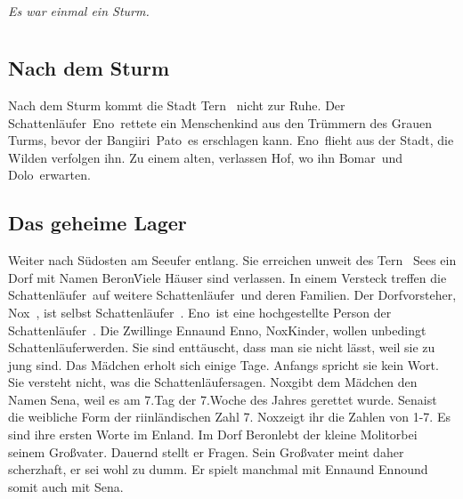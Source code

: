 \documentclass[12pt,a4paper,onecolumn,twoside,ngerman]{book}
\newcommand{\Tern}{Tern }
\newcommand{\Beron}{Beron}
\newcommand{\Molitor}{Molitor}
\newcommand{\Sena}{Sena}
\newcommand{\Bangiri}{Bangiiri}
\newcommand{\Pato}{Pato}
\newcommand{\Enland}{Enland}
\newcommand{\Schattenlaufer}{Schattenläufer}
\newcommand{\Eno}{Eno}
\newcommand{\Bomar}{Bomar}
\newcommand{\Dolo}{Dolo}
\newcommand{\Nox}{Nox}
\newcommand{\Enna}{Enna}
\newcommand{\Enno}{Enno}
\begin{document}
  
  
  
  \tableofcontents
  


\paragraph{}
\textit{Es war einmal ein Sturm.}

\chapter{}
\section{Nach dem Sturm}
Nach dem Sturm kommt die Stadt \Tern\ nicht zur Ruhe.
Der \Schattenlaufer\ \Eno\ rettete ein Menschenkind aus den Trümmern des Grauen Turms, bevor der \Bangiri\ \Pato\ es erschlagen kann. \Eno\ flieht aus der Stadt, die Wilden verfolgen ihn. Zu einem alten, verlassen Hof, wo ihn \Bomar\ und \Dolo\ erwarten. 

\section{Das geheime Lager}
Weiter nach Südosten am Seeufer entlang. Sie erreichen unweit des \Tern\ Sees ein Dorf mit Namen \Beron\. Viele Häuser sind verlassen. In einem Versteck treffen die \Schattenlaufer\ auf weitere \Schattenlaufer\ und deren Familien. Der Dorfvorsteher, \Nox\ , ist selbst \Schattenlaufer\ . \Eno\ ist eine hochgestellte Person der \Schattenlaufer\ .
Die Zwillinge \Enna  und \Enno , \Nox  Kinder, wollen unbedingt \Schattenlaufer  werden. Sie sind enttäuscht, dass man sie nicht lässt, weil sie zu jung sind. Das Mädchen erholt sich einige Tage. Anfangs spricht sie kein Wort. Sie versteht nicht, was die \Schattenlaufer  sagen.
\Nox  gibt dem Mädchen den Namen \Sena , weil es am 7.Tag der 7.Woche des Jahres gerettet wurde. \Sena    ist die weibliche Form der riinländischen Zahl 7. \Nox  zeigt ihr die Zahlen von 1-7. Es sind ihre ersten Worte im  \Enland .
Im Dorf \Beron  lebt der kleine \Molitor  bei seinem Großvater. Dauernd stellt er Fragen. Sein Großvater meint daher scherzhaft, er sei wohl zu dumm. Er spielt manchmal mit \Enna  und \Enno  und somit auch mit \Sena . 
\end{document}
